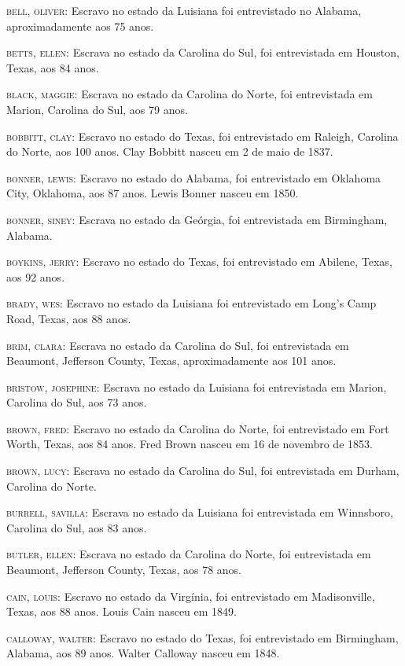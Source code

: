 \begin{Parskip}
\textsc{bell, oliver:} Escravo no estado da Luisiana foi entrevistado no
Alabama, aproximadamente aos 75 anos.

\textsc{betts, ellen:} Escrava no estado da Carolina do Sul, foi
entrevistada em Houston, Texas, aos 84 anos.

\textsc{black, maggie:} Escrava no estado da Carolina do Norte, foi
entrevistada em Marion, Carolina do Sul, aos 79 anos.

\textsc{bobbitt, clay:} Escravo no estado do Texas, foi entrevistado em
Raleigh, Carolina do Norte, aos 100 anos. Clay Bobbitt nasceu em 2 de
maio de 1837.

\textsc{bonner, lewis:} Escravo no estado do Alabama, foi entrevistado
em Oklahoma City, Oklahoma, aos 87 anos. Lewis Bonner nasceu em 1850.

\textsc{bonner, siney:} Escrava no estado da Geórgia, foi entrevistada
em Birmingham, Alabama.

\textsc{boykins, jerry:} Escravo no estado do Texas, foi entrevistado em
Abilene, Texas, aos 92 anos.

\textsc{brady, wes:} Escravo no estado da Luisiana foi entrevistado em
Long's Camp Road, Texas, aos 88 anos.

\textsc{brim, clara:} Escrava no estado da Carolina do Sul, foi
entrevistada em Beaumont, Jefferson County, Texas, aproximadamente aos
101 anos.

\textsc{bristow, josephine:} Escrava no estado da Luisiana foi
entrevistada em Marion, Carolina do Sul, aos 73 anos.

\textsc{brown, fred:} Escravo no estado da Carolina do Norte, foi
entrevistado em Fort Worth, Texas, aos 84 anos. Fred Brown nasceu em 16
de novembro de 1853.

\textsc{brown, lucy:} Escrava no estado da Carolina do Sul, foi
entrevistada em Durham, Carolina do Norte.

\textsc{burrell, savilla:} Escrava no estado da Luisiana foi
entrevistada em Winnsboro, Carolina do Sul, aos 83 anos.

\textsc{butler, ellen:} Escrava no estado da Carolina do Norte, foi
entrevistada em Beaumont, Jefferson County, Texas, aos 78 anos.

\textsc{cain, louis:} Escravo no estado da Virgínia, foi entrevistado em
Madisonville, Texas, aos 88 anos. Louis Cain nasceu em 1849.

\textsc{calloway, walter:} Escravo no estado do Texas, foi entrevistado
em Birmingham, Alabama, aos 89 anos. Walter Calloway nasceu em 1848.


\end{Parskip}
